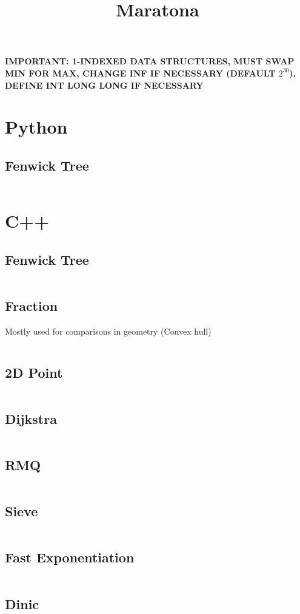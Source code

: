 \documentclass{article}
\title{Maratona}
\author{}
\date{}
\begin{document}
\maketitle

\textbf{IMPORTANT: 1-INDEXED DATA STRUCTURES, MUST SWAP MIN FOR MAX,
CHANGE INF IF NECESSARY (DEFAULT $2^{30}$), DEFINE INT LONG LONG IF NECESSARY}

\tableofcontents
\newpage

\section{Python}
\subsection{Fenwick Tree}
\inputminted{python}{code/fenwick.py}

\section{C++}
\subsection{Fenwick Tree}
\inputminted[obeytabs=true,tabsize=4]{cpp}{code/fenwick.cpp}
\subsection{Fraction}
Mostly used for comparisons in geometry (Convex hull)
\inputminted[obeytabs=true,tabsize=4]{cpp}{code/fraction.cpp}
\subsection{2D Point}
\inputminted[obeytabs=true,tabsize=4]{cpp}{code/point.cpp}
\subsection{Dijkstra}
\inputminted[obeytabs=true,tabsize=4]{cpp}{code/dijkstra.cpp}
\subsection{RMQ}
\inputminted[obeytabs=true,tabsize=4]{cpp}{code/rmq.cpp}
\subsection{Sieve}
\inputminted[obeytabs=true,tabsize=4]{cpp}{code/sieve.cpp}
\subsection{Fast Exponentiation}
\inputminted[obeytabs=true,tabsize=4]{cpp}{code/fast_exp.cpp}
\subsection{Dinic}
\inputminted[obeytabs=true,tabsize=4]{cpp}{code/dinic.cpp}
\end{document}
